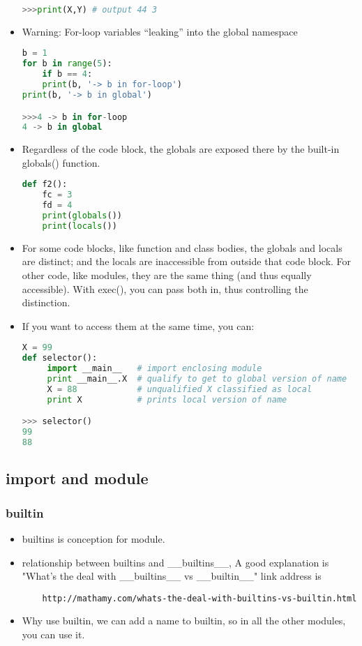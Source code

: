 \documentclass[a4paper,12pt,twoside]{book}
\begin{document}
\begin{itemize}
\begin{lstlisting}[frame=single, language=Python]
>>>print(X,Y) # output 44 3
\end{lstlisting}  

\item Warning: For-loop variables “leaking” into the global namespace
\begin{lstlisting}[frame=single, language=Python]
b = 1
for b in range(5):
	if b == 4:
	print(b, '-> b in for-loop')
print(b, '-> b in global')

>>>4 -> b in for-loop
4 -> b in global
\end{lstlisting}  

	\item Regardless of the code block, the globals are exposed there by the built-in globals() function. 
\begin{lstlisting}[frame=single, language=Python]
	def f2():
	fc = 3
	fd = 4
	print(globals())
	print(locals())
\end{lstlisting}  
	
	\item For some code blocks, like function and class bodies, the globals and locals are distinct; and the locals are inaccessible from outside that code block. For other code, like modules, they are the same thing (and thus equally accessible). With exec(), you can pass both in, thus controlling the distinction.

	\item If you want to access them at the same time, you can:
\begin{lstlisting}[frame=single, language=python]
X = 99
def selector():
     import __main__   # import enclosing module
     print __main__.X  # qualify to get to global version of name
     X = 88            # unqualified X classified as local
     print X           # prints local version of name

>>> selector()
99
88
	\end{lstlisting} 
\end{itemize}

\subsection{import and module}
\subsubsection{builtin}
\begin{itemize}
	\item builtins is conception for module.
	\item relationship between builtins and \_\_builtins\_\_, A good explanation is "What's the deal with \_\_builtins\_\_ vs \_\_builtin\_\_" link address is \begin{verbatim}
	http://mathamy.com/whats-the-deal-with-builtins-vs-builtin.html \end{verbatim}
	\item Why use builtin, we can add a name to builtin,  so in all the other modules, you can use it.
\end{itemize}
\end{document}

